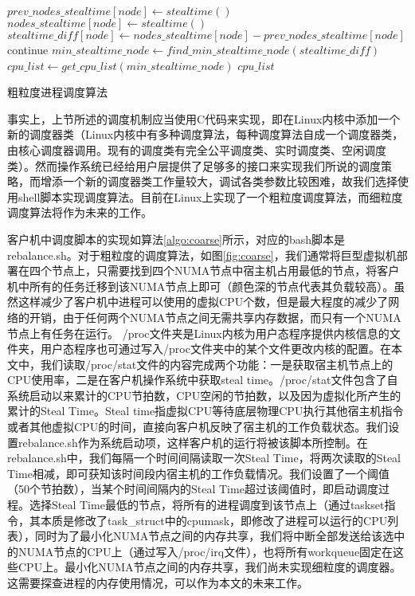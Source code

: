 \begin{algorithm}[h]
\begin{algorithmic}[1]
\State
{}
\State
{}
\State
{}
\EndFor
\EndFunction
\State
{}
\State $prev\_nodes\_stealtime[node] \gets stealtime()$
\EndFor
\State
{}
\State $nodes\_stealtime[node] \gets stealtime()$
\State $stealtime\_diff[node] \gets nodes\_stealtime[node] - prev\_nodes\_stealtime[node]$
\EndFor
{}
\State continue
\EndIf
\State $min\_stealtime\_node \gets find\_min\_stealtime\_node(stealtime\_diff)$
\State $cpu\_list \gets get\_cpu\_list(min\_stealtime\_node)$
\State
{} {$cpu\_list$}
\EndWhile
\end{algorithmic}
\caption{粗粒度进程调度算法}
\label{algo:coarse}
\end{algorithm}
事实上，上节所述的调度机制应当使用C代码来实现，即在Linux内核中添加一个新的调度器类（Linux内核中有多种调度算法，每种调度算法自成一个调度器类，由核心调度器调用。现有的调度类有完全公平调度类、实时调度类、空闲调度类）。然而操作系统已经给用户层提供了足够多的接口来实现我们所说的调度策略，而增添一个新的调度器类工作量较大，调试各类参数比较困难，故我们选择使用shell脚本实现调度算法。目前在Linux上实现了一个粗粒度调度算法，而细粒度调度算法将作为未来的工作。

客户机中调度脚本的实现如算法\ref{algo:coarse}所示，对应的bash脚本是rebalance.sh。对于粗粒度的调度算法，如图\ref{fig:coarse}，我们通常将巨型虚拟机部署在四个节点上，只需要找到四个NUMA节点中宿主机占用最低的节点，将客户机中所有的任务迁移到该NUMA节点上即可（颜色深的节点代表其负载较高）。虽然这样减少了客户机中进程可以使用的虚拟CPU个数，但是最大程度的减少了网络的开销，由于任何两个NUMA节点之间无需共享内存数据，而只有一个NUMA节点上有任务在运行。
/proc文件夹是Linux内核为用户态程序提供内核信息的文件夹，用户态程序也可通过写入/proc文件夹中的某个文件更改内核的配置。在本文中，我们读取/proc/stat文件的内容完成两个功能：一是获取宿主机节点上的CPU使用率，二是在客户机操作系统中获取steal time。/proc/stat文件包含了自系统启动以来累计的CPU节拍数，CPU空闲的节拍数，以及因为虚拟化所产生的累计的Steal Time。Steal time指虚拟CPU等待底层物理CPU执行其他宿主机指令或者其他虚拟CPU的时间，直接向客户机反映了宿主机的工作负载状态。我们设置rebalance.sh作为系统启动项，这样客户机的运行将被该脚本所控制。在rebalance.sh中，我们每隔一个时间间隔读取一次Steal Time，将两次读取的Steal Time相减，即可获知该时间段内宿主机的工作负载情况。我们设置了一个阈值（50个节拍数），当某个时间间隔内的Steal Time超过该阈值时，即启动调度过程。选择Steal Time最低的节点，将所有的进程调度到该节点上（通过taskset指令，其本质是修改了task\_struct中的cpumask，即修改了进程可以运行的CPU列表），同时为了最小化NUMA节点之间的内存共享，我们将中断全部发送给该选中的NUMA节点的CPU上（通过写入/proc/irq文件），也将所有workqueue固定在这些CPU上。最小化NUMA节点之间的内存共享，我们尚未实现细粒度的调度器。这需要探查进程的内存使用情况，可以作为本文的未来工作。

